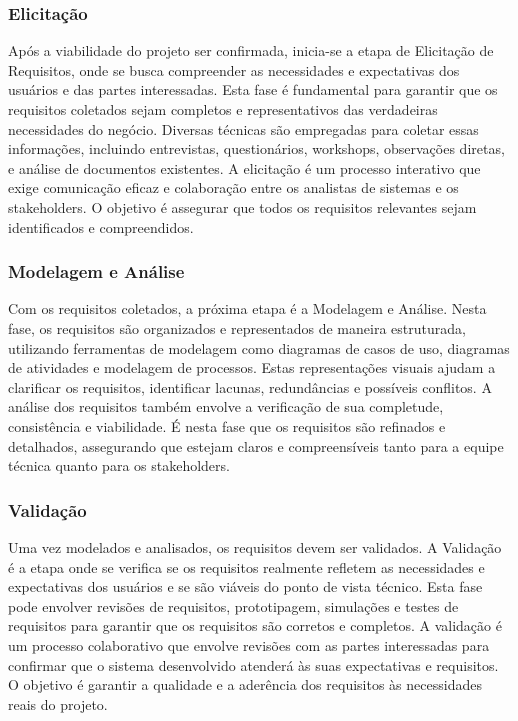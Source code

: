     \subsubsection{Elicitação}
    Após a viabilidade do projeto ser confirmada, inicia-se a etapa de Elicitação de Requisitos, onde se busca compreender as necessidades e expectativas dos usuários e das partes interessadas. Esta fase é fundamental para garantir que os requisitos coletados sejam completos e representativos das verdadeiras necessidades do negócio. Diversas técnicas são empregadas para coletar essas informações, incluindo entrevistas, questionários, workshops, observações diretas, e análise de documentos existentes. A elicitação é um processo interativo que exige comunicação eficaz e colaboração entre os analistas de sistemas e os stakeholders. O objetivo é assegurar que todos os requisitos relevantes sejam identificados e compreendidos.
    
    \subsubsection{Modelagem e Análise}
    Com os requisitos coletados, a próxima etapa é a Modelagem e Análise. Nesta fase, os requisitos são organizados e representados de maneira estruturada, utilizando ferramentas de modelagem como diagramas de casos de uso, diagramas de atividades e modelagem de processos. Estas representações visuais ajudam a clarificar os requisitos, identificar lacunas, redundâncias e possíveis conflitos. A análise dos requisitos também envolve a verificação de sua completude, consistência e viabilidade. É nesta fase que os requisitos são refinados e detalhados, assegurando que estejam claros e compreensíveis tanto para a equipe técnica quanto para os stakeholders.
    
    \subsubsection{Validação}
    Uma vez modelados e analisados, os requisitos devem ser validados. A Validação é a etapa onde se verifica se os requisitos realmente refletem as necessidades e expectativas dos usuários e se são viáveis do ponto de vista técnico. Esta fase pode envolver revisões de requisitos, prototipagem, simulações e testes de requisitos para garantir que os requisitos são corretos e completos. A validação é um processo colaborativo que envolve revisões com as partes interessadas para confirmar que o sistema desenvolvido atenderá às suas expectativas e requisitos. O objetivo é garantir a qualidade e a aderência dos requisitos às necessidades reais do projeto.
    
